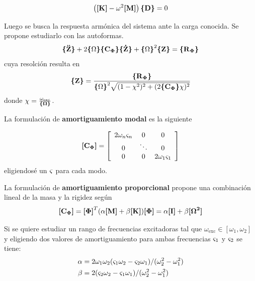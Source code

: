 \documentclass[onecolumn,10pt,titlepage,a4paper]{article}
\begin{document}
\begin{equation} \label{eq:eigenvalueproblem}
	\left( \Mme{K} - \omega^2 \Mme{M}\right)\Cme{D}= 0
\end{equation}

Luego se busca la respuesta armónica del sistema ante la carga conocida. Se propone estudiarlo con las autoformas.
\begin{equation} \label{eq:Zmodal}
	 \Cme{\boldsymbol{\ddot{\mathrm{Z}}}}+2\COmega \Cme{C\modal} \Cme{\boldsymbol{\dot{\mathrm{Z}}}} + \COmega^2 \Cme{Z} = \Cme{R\modal}
\end{equation}
cuya resolción resulta en 
\begin{equation}
	\Cme{Z} = \frac{\Cme{R\modal }}{{\COmega}^2 \sqrt{(1-\chi^2)^2 + (2 \Cme{C\modal} \chi)^2}}
\end{equation}
donde $\chi = \frac{\omega_{\mathrm{exc}}}{\Cme{\Omega}}$.

La formulación de \textbf{amortiguamiento modal} es la siguiente

\begin{equation}
\Mme{C\modal}=\left[ \begin{array}{ccc}{2 \omega_{n} \dampfact_{n}} & {0} & {0} \\ {0} & {\ddots} & {0} \\ {0} & {0} & {2 \omega_{1} \dampfact_{1}}\end{array}\right]
\end{equation}
eligiendosé un $\dampfact$ para cada modo.

La formulación de \textbf{amortiguamiento proporcional} propone una combinación lineal de la masa y la rigidez según
\begin{equation} \label{eq:proporcional}
\Mme{C\modal} = \Mme{\Phib}^T ( \alpha \Mme{M}+\beta \Mme{K})\Mme{\Phib} = \alpha \Mme{I} +\beta \Mme{\Omegab^2}
\end{equation}

Si se quiere estudiar un rango de frecuencias excitadoras tal que $\omega_{\mathrm{exc}}\in [\omega_1, \omega_2]$ y eligiendo dos valores de amortiguamiento para ambas frecuencias $\dampfact_1$ y $\dampfact_2$ se tiene: \cite{cook2007concepts}
\begin{align} \label{eq:alfabeta}
\alpha &= 2\omega_1 \omega_2 (\dampfact_1 \omega_2 -\dampfact_2 \omega_1)/(\omega_2^2 - \omega_1^2) \\ \beta &= 2(\dampfact_2\omega_2 -\dampfact_1 \omega_1)/(\omega_2^2 - \omega_1^2)
\end{align}
\end{document}
